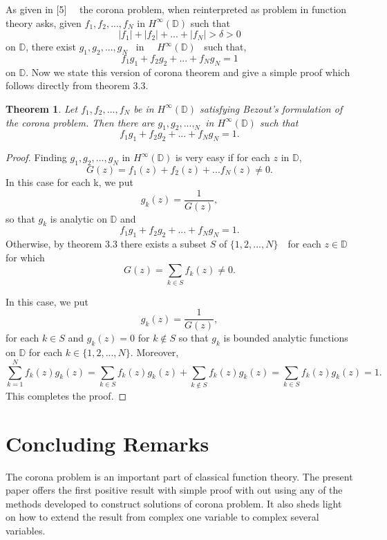 \documentclass[reqno, 12pt]{amsart}
\newtheorem{theorem}{Theorem}[section]
\theoremstyle{definition}
\theoremstyle{definition}
\begin{document}
As given in [5] ~~the corona problem, when reinterpreted as problem in function theory asks, given $f_1, f_2,...,f_N$ in  $H^\infty(\mathbb{D})$ such that 
$$\lvert f_1 \rvert+ \lvert f_2 \rvert +...+ \lvert f_N \rvert > \delta > 0$$ on $\mathbb{D}$, there exist $g_1, g_2, ..., g_N $~ in ~~$ H^\infty(\mathbb{D}) $ ~such that, $$f_1g_1+f_2g_2+...+f_Ng_N=1$$ on $\mathbb{D}.$ Now we state this version of corona theorem and give a simple proof which follows directly from theorem 3.3. 


\begin{theorem}
Let $f_1, f_2,...,f_N$ be in $H^\infty(\mathbb{D})$  satisfying Bezout's formulation of the corona problem. Then there are  $g_1, g_2, ...,_N$  in $H^\infty(\mathbb{D})$ such that
  $$f_1g_1+f_2g_2+...+f_Ng_N = 1.$$ 
\end{theorem}

\begin{proof}
Finding $g_1, g_2, ..., g_N $ in $ H^\infty(\mathbb{D}) $ is very easy if for each $z$ in $\mathbb{D}$, $$G(z)= f_1(z)+f_2(z)+...f_N(z)\neq 0.$$ In this case for each k, we put$$g_k(z)=\frac{1}{G(z)} ,$$ so that $g_k$ is analytic on $\mathbb{D}$ and $$f_1g_1+f_2g_2+...+f_Ng_N = 1.$$  Otherwise, by theorem 3.3 there exists  a subset $S$ of $\{1, 2,..., N\}$~~for each $z \in \mathbb{D} $ for which  $$G(z)= \sum_{k\in S}f_k(z) \neq 0.$$ 

In this case, we put $$g_k(z)=\frac{1}{G(z)} ,$$ for each $k \in S$ and   $g_k(z)=0$ for $k\notin S$ so that $g_k$ is bounded analytic functions on $\mathbb{D}$ for each $k\in \{1, 2, ..., N\}$. Moreover, $$\sum_{k=1}^N f_k(z)g_k(z)=\sum_{k\in S}f_k(z)g_k(z)+\sum_{k\notin S}f_k(z)g_k(z)=\sum_{k\in S}f_k(z)g_k(z)=1.$$ This completes the proof.
\end{proof}

\section{Concluding Remarks}The corona problem is an important part of classical function theory. The present paper offers the first positive result with simple proof with out using any of the methods developed to construct solutions of corona problem. It also sheds light on how to extend the result from complex one variable to complex several variables.
\end{document}
